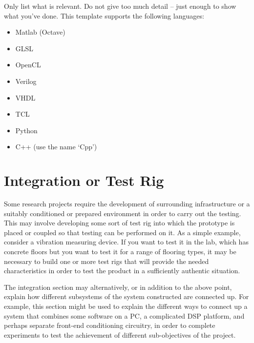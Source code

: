 Only list what is relevant.  Do not give too much detail -- just enough to show what you've done.  This template supports the following languages:

\begin{itemize}
  \item Matlab (Octave)
  \item GLSL
  \item OpenCL
  \item Verilog
  \item VHDL
  \item TCL
  \item Python
  \item C++ (use the name `Cpp')
\end{itemize}

\section{Integration or Test Rig}

Some research projects require the development of surrounding infrastructure or a suitably conditioned or prepared environment in order to carry out the testing. This may involve developing some sort of test rig into which the prototype is placed or coupled so that testing can be performed on it.  As a simple example, consider a vibration measuring device. If you want to test it in the lab, which has concrete floors but you want to test it for a range of flooring types, it may be necessary to build one or more test rigs that will provide the needed characteristics in order to test the product in a sufficiently authentic situation.

The integration section may alternatively, or in addition to the above point, explain how different subsystems of the system constructed are connected up.  For example, this section might be used to explain the different ways to connect up a system that combines some software on a PC, a complicated DSP platform, and perhaps separate front-end conditioning circuitry, in order to complete experiments to test the achievement of different sub-objectives of the project.
